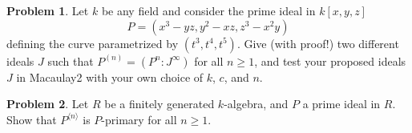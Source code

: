 \documentclass[11pt]{article}
\theoremstyle{definition}
\newtheorem{problem}{Problem}
\begin{document}
\begin{problem}
	Let $k$ be any field and consider the prime ideal in $k[x,y,z]$
	$$P = (x^3-yz,y^2-xz,z^3-x^2y)$$
	defining the curve parametrized by $(t^3, t^4, t^5)$. Give (with proof!) two different ideals $J$ such that $P^{(n)} = (P^n : J^\infty)$ for all $n \geqslant 1$, and test your proposed ideals $J$ in Macaulay2 with your own choice of $k$, $c$, and $n$.
\end{problem}


\begin{problem}
	Let $R$ be a finitely generated $k$-algebra, and $P$ a prime ideal in $R$. Show that $P^{\langle n\rangle}$ is $P$-primary for all $n \geqslant 1$.
\end{problem}
\end{document}
